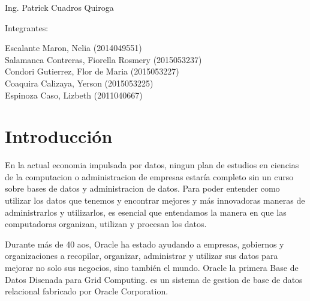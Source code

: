 \documentclass[12pt,letterpaper]{article}
\begin{document}
\begin{titlepage}
\begin{center}
\vspace*{0.1in}
\begin{large}
 Ing. Patrick Cuadros Quiroga\\
\end{large}

\vspace*{0.2in}
\vspace*{0.1in}
\begin{large}
Integrantes: \\
\begin{flushleft}
Escalante Maron, Nelia 		\hfill	(2014049551) \\
Salamanca Contreras, Fiorella Rosmery		\hfill	(2015053237) \\
Condori Gutierrez, Flor de Maria            	\hfill	(2015053227) \\
Coaquira Calizaya, Yerson      	\hfill	(2015053225) \\
Espinoza Caso, Lizbeth  		\hfill	(2011040667) \\
\end{flushleft}
\end{large}
\end{center}

\end{titlepage}


 \tableofcontents
 \newpage

 
\section{Introducci\'on} 
En la actual economia impulsada por datos, ningun plan de estudios en ciencias de la computacion o administracion de empresas estaría completo sin un curso sobre bases de datos y administracion de datos. Para poder entender como utilizar los datos que tenemos y encontrar mejores y más innovadoras maneras de administrarlos y utilizarlos, es esencial que entendamos la manera en que las computadoras organizan, utilizan y procesan los datos.

Durante más de 40 aos, Oracle ha estado ayudando a empresas, gobiernos y organizaciones a recopilar, organizar, administrar y utilizar sus datos para mejorar no solo sus negocios, sino también el mundo. 
Oracle la primera Base de Datos Disenada para Grid Computing. es un sistema de gestion de  base de datos relacional fabricado por Oracle Corporation.
\end{document}
